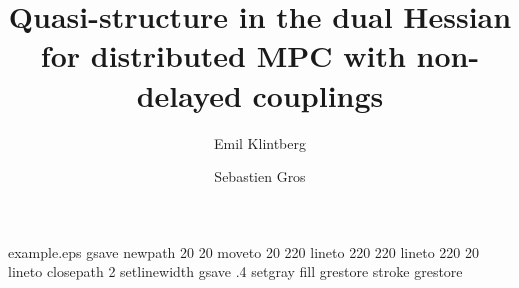 %
%
%
%
%
\begin{filecontents*}{example.eps}
gsave
newpath
  20 20 moveto
  20 220 lineto
  220 220 lineto
  220 20 lineto
closepath
2 setlinewidth
gsave
  .4 setgray fill
grestore
stroke
grestore
\end{filecontents*}
%
\RequirePackage{fix-cm}
%
\documentclass[smallextended]{svjour3}       %
%
\smartqed  %
%
\usepackage{graphicx}
\usepackage{amsmath}              
  {
      \newtheorem{assumption}{Assumption}
  }
\usepackage{amssymb}
\usepackage{graphicx}
%
%
%
%
%


\title{Quasi-structure in the dual Hessian for distributed MPC with non-delayed couplings%
}


\author{Emil Klintberg         \and
        Sebastien Gros %
}

